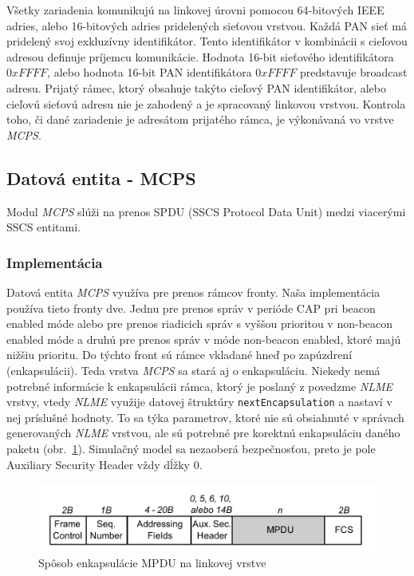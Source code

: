\indent\indent Všetky zariadenia komunikujú na linkovej úrovni pomocou 64-bitových IEEE adries, alebo 16-bitových adries pridelených sieťovou vrstvou. Každá PAN sieť má pridelený svoj exkluzívny identifikátor. Tento identifikátor v kombinácii s cieľovou adresou definuje príjemcu komunikácie. Hodnota 16-bit sieťového identifikátora $0xFFFF$, alebo hodnota 16-bit PAN identifikátora $0xFFFF$ predstavuje broadcast adresu. Prijatý rámec, ktorý obsahuje takýto cieľový PAN identifikátor, alebo cieľovú sieťovú adresu nie je zahodený a je spracovaný linkovou vrstvou. Kontrola toho, či dané zariadenie je adresátom prijatého rámca, je výkonávaná vo vrstve \textit{MCPS}.\\

\subsection{Datová entita - MCPS}
\indent\indent Modul \textit{MCPS} slúži na prenos SPDU (SSCS Protocol Data Unit) medzi viacerými SSCS entitami.\\

\subsubsection{Implementácia}
\indent\indent Datová entita \textit{MCPS} využíva pre prenos rámcov fronty. Naša implementácia používa tieto fronty dve. Jednu pre prenos správ v perióde CAP pri beacon enabled móde alebo pre prenos riadicich správ s vyššou prioritou v non-beacon enabled móde a druhú pre prenos správ v móde non-beacon enabled, ktoré majú nižšiu prioritu. Do týchto front sú rámce vkladané hneď po zapúzdrení (enkapsulácii). Teda vrstva \textit{MCPS} sa stará aj o enkapsuláciu. Niekedy nemá potrebné informácie k enkapsulácii rámca, ktorý je poslaný z povedzme \textit{NLME} vrstvy, vtedy \textit{NLME} využije datovej štruktúry \texttt{nextEncapsulation} a nastaví v nej príslušné hodnoty. To sa týka parametrov, ktoré nie sú obsiahnuté v správach generovaných \textit{NLME} vrstvou, ale sú potrebné pre korektnú enkapsuláciu daného paketu (obr.~\ref{fig:frame_mac}). Simulačný model sa nezaoberá bezpečnosťou, preto je pole Auxiliary Security Header vždy dĺžky $0$.\\

\begin{figure}[htbp]
\begin{center}
\includegraphics[width=140mm]{figures/frame_mac}
\caption{Spôsob enkapsulácie MPDU na linkovej vrstve}
\label{fig:frame_mac}
\end{center}
\end{figure}

